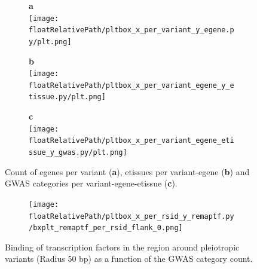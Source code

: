 %
%

\begin{figure}[!]
\centering
%
\begin{subfigure}[]{.33\textwidth}
\textbf{a}
\\
\texttt{[image: \\floatRelativePath/pltbox\_x\_per\_variant\_y\_egene.py/plt.png]}
\end{subfigure}
%
\begin{subfigure}[]{.33\textwidth}
\textbf{b}
\\
\texttt{[image: \\floatRelativePath/pltbox\_x\_per\_variant\_egene\_y\_etissue.py/plt.png]}
\end{subfigure}
%
\begin{subfigure}[]{.33\textwidth}
\textbf{c}
\\
\texttt{[image: \\floatRelativePath/pltbox\_x\_per\_variant\_egene\_etissue\_y\_gwas.py/plt.png]}
\end{subfigure}
%
\caption{Count of egenes per variant (\textbf{a}), etissues per variant-egene (\textbf{b}) and GWAS categories per variant-egene-etissue (\textbf{c}).} \label{fig:gwas_egene_etisue_per_variant}
%
\end{figure}

%
%

\begin{figure}[!]
\centering
%
\begin{subfigure}[]{.33\textwidth}
%
\texttt{[image: \\floatRelativePath/pltbox\_x\_per\_rsid\_y\_remaptf.py/bxplt\_remaptf\_per\_rsid\_flank\_0.png]}
\end{subfigure}
%
\caption{Binding of transcription factors in the region around pleiotropic variants (Radius 50 bp) as a function of the GWAS category count.} \label{fig:freq_tf_per_variant}
%
\end{figure}

%
%

